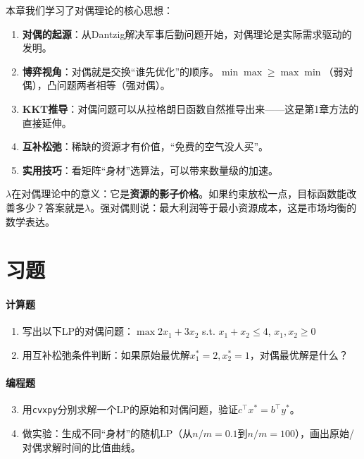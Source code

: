本章我们学习了对偶理论的核心思想：

\begin{enumerate}
    \item \textbf{对偶的起源}：从Dantzig解决军事后勤问题开始，对偶理论是实际需求驱动的发明。

    \item \textbf{博弈视角}：对偶就是交换“谁先优化”的顺序。$\min\max \geq \max\min$（弱对偶），凸问题两者相等（强对偶）。

    \item \textbf{KKT推导}：对偶问题可以从拉格朗日函数自然推导出来——这是第1章方法的直接延伸。

    \item \textbf{互补松弛}：稀缺的资源才有价值，“免费的空气没人买”。

    \item \textbf{实用技巧}：看矩阵“身材”选算法，可以带来数量级的加速。
\end{enumerate}

\begin{physicalmeaning}
$\lambda$在对偶理论中的意义：它是\textbf{资源的影子价格}。如果约束放松一点，目标函数能改善多少？答案就是$\lambda$。强对偶则说：最大利润等于最小资源成本，这是市场均衡的数学表达。
\end{physicalmeaning}

\section{习题}

\paragraph{计算题}
\begin{enumerate}
    \item 写出以下LP的对偶问题：$\max 2x_1 + 3x_2$ s.t. $x_1 + x_2 \leq 4$, $x_1, x_2 \geq 0$

    \item 用互补松弛条件判断：如果原始最优解$x_1^* = 2, x_2^* = 1$，对偶最优解是什么？
\end{enumerate}

\paragraph{编程题}
\begin{enumerate}
    \setcounter{enumi}{2}
    \item 用\texttt{cvxpy}分别求解一个LP的原始和对偶问题，验证$c^\top x^* = b^\top y^*$。

    \item 做实验：生成不同“身材”的随机LP（从$n/m = 0.1$到$n/m = 100$），画出原始/对偶求解时间的比值曲线。
\end{enumerate}

